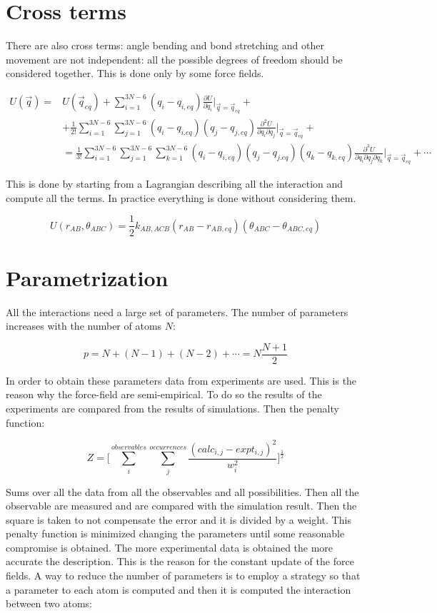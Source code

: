 \section{Cross terms}
There are also cross terms: angle bending and bond stretching and other movement are not independent: all the possible degrees of freedom should be considered together.
This is done only by some force fields.

\begin{align*}
	U(\vec{q}) = &U(\vec{q}_{eq}) + \sum\limits_{i=1}^{3N-6}(q_i-q_{i,eq})\frac{\partial U}{\partial q_i}\biggr\vert_{\vec{q}=\vec{q}_{eq}} + \\
							 &+\frac{1}{2!}\sum\limits_{i=1}^{3N-6}\sum\limits_{j=1}^{3N-6}(q_i-q_{i.eq})(q_j-q_{j,eq})\frac{\partial^2 U}{\partial q_i\partial q_j}\biggr\vert_{\vec{q}=\vec{q}_{eq}} +\\
							 &=\frac{1}{3!}\sum\limits_{i=1}^{3N-6}\sum\limits_{j=1}^{3N-6}\sum\limits_{k=1}^{3N-6}(q_i-q_{i,eq})(q_j-q_{j.eq})(q_k-q_{k,eq})\frac{\partial^3 U}{\partial q_i\partial q_j\partial q_k}\biggr\vert_{\vec{q}=\vec{q}_{eq}} + \cdots
\end{align*}

This is done by starting from a Lagrangian describing all the interaction and compute all the terms.
In practice everything is done without considering them.

$$U(r_{AB}, \theta_{ABC}) = \frac{1}{2}k_{AB,ACB}(r_{AB}-r_{AB, eq})(\theta_{ABC}-\theta_{ABC, eq})$$

\section{Parametrization}
All the interactions need a large set of parameters.
The number of parameters increases with the number of atoms $N$:

$$p = N + (N-1)+(N-2)+\cdots = N\frac{N+1}{2}$$

In order to obtain these parameters data from experiments are used.
This is the reason why the force-field are semi-empirical.
To do so the results of the experiments are compared from the results of simulations.
Then the penalty function:

$$Z = \biggl[\sum\limits_{i}^{observables}\sum\limits_{j}^{occurrences}\frac{(calc_{i,j}-expt_{i,j})^2}{w_i^2}\biggr]^{\frac{1}{2}}$$

Sums over all the data from all the observables and all possibilities.
Then all the observable are measured and are compared with the simulation result.
Then the square is taken to not compensate the error and it is divided by a weight.
This penalty function is minimized changing the parameters until some reasonable compromise is obtained.
The more experimental data is obtained the more accurate the description.
This is the reason for the constant update of the force fields.
A way to reduce the number of parameters is to employ a strategy so that a parameter to each atom is computed and then it is computed the interaction between two atoms:

